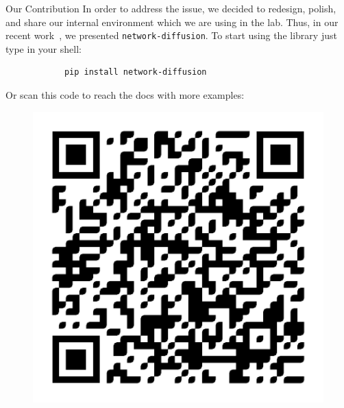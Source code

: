 \documentclass[final]{beamer}
\newlength{\colwidth}
\begin{document}
\begin{frame}[t, fragile]
\begin{columns}[t]
\begin{column}{\colwidth}
\begin{block}{Our Contribution}
    In order to address the issue, we decided to redesign, polish, and share our internal 
    environment which we are using in the lab. Thus, in our recent work~\cite{czuba2024networkdiffusion},
    we presented \lstinline[style=py]{network-diffusion}. To start using the library just type in 
    your shell:
    \begin{center}
        \large
        \begin{verbatim}
            pip install network-diffusion
        \end{verbatim}
    \end{center}
    \vspace{-1em}
    Or scan this code to reach the docs with more examples:
    \begin{figure}
        \includegraphics[width=15cm]{../presentation/figures/qr_code.pdf}
    \end{figure}
\end{block}


\end{column}
\end{columns}
\end{frame}
\end{document}
